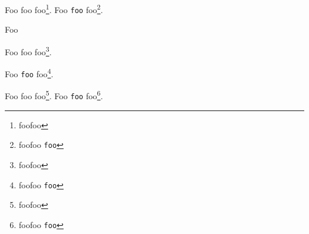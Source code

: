 \documentclass{article}
\begin{document}
Foo foo foo\footnote{foofoo}.
Foo \verb|foo| foo\footnote{foofoo \verb|foo|}.

Foo\begin{minipage}{6em}
Foo foo foo\footnote{foofoo}.\par
Foo \verb|foo| foo\footnote{foofoo \verb|foo|}.\par
\end{minipage}

\newpage

Foo foo foo\footnote{foofoo}.
Foo \verb|foo| foo\footnote{foofoo \verb|foo|}.
\end{document}
